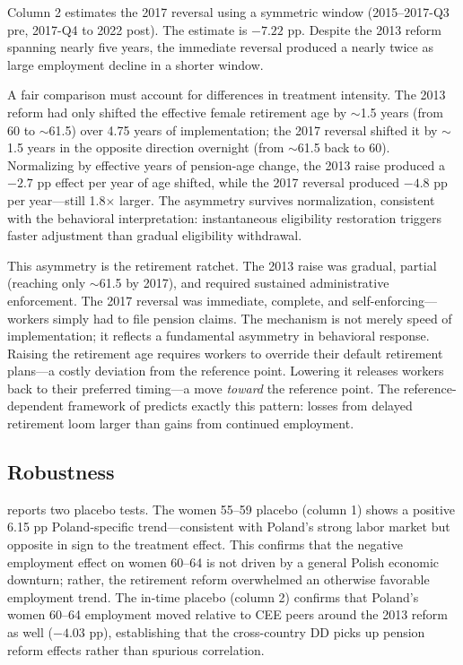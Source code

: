 \documentclass[12pt]{article}
\begin{document}
Column 2 estimates the 2017 reversal using a symmetric window (2015--2017-Q3 pre, 2017-Q4 to 2022 post). The estimate is $-7.22$ pp. Despite the 2013 reform spanning nearly five years, the immediate reversal produced a nearly twice as large employment decline in a shorter window.

A fair comparison must account for differences in treatment intensity. The 2013 reform had only shifted the effective female retirement age by $\sim$1.5 years (from 60 to $\sim$61.5) over 4.75 years of implementation; the 2017 reversal shifted it by $\sim$1.5 years in the opposite direction overnight (from $\sim$61.5 back to 60). Normalizing by effective years of pension-age change, the 2013 raise produced a $-2.7$ pp effect per year of age shifted, while the 2017 reversal produced $-4.8$ pp per year---still 1.8$\times$ larger. The asymmetry survives normalization, consistent with the behavioral interpretation: instantaneous eligibility restoration triggers faster adjustment than gradual eligibility withdrawal.



This asymmetry is the retirement ratchet. The 2013 raise was gradual, partial (reaching only $\sim$61.5 by 2017), and required sustained administrative enforcement. The 2017 reversal was immediate, complete, and self-enforcing---workers simply had to file pension claims. The mechanism is not merely speed of implementation; it reflects a fundamental asymmetry in behavioral response. Raising the retirement age requires workers to override their default retirement plans---a costly deviation from the reference point. Lowering it releases workers back to their preferred timing---a move \textit{toward} the reference point. The reference-dependent framework of \citet{seibold2021reference} predicts exactly this pattern: losses from delayed retirement loom larger than gains from continued employment.


\subsection{Robustness}

 reports two placebo tests. The women 55--59 placebo (column 1) shows a positive 6.15 pp Poland-specific trend---consistent with Poland's strong labor market but opposite in sign to the treatment effect. This confirms that the negative employment effect on women 60--64 is not driven by a general Polish economic downturn; rather, the retirement reform overwhelmed an otherwise favorable employment trend. The in-time placebo (column 2) confirms that Poland's women 60--64 employment moved relative to CEE peers around the 2013 reform as well ($-4.03$ pp), establishing that the cross-country DD picks up pension reform effects rather than spurious correlation.
\end{document}
